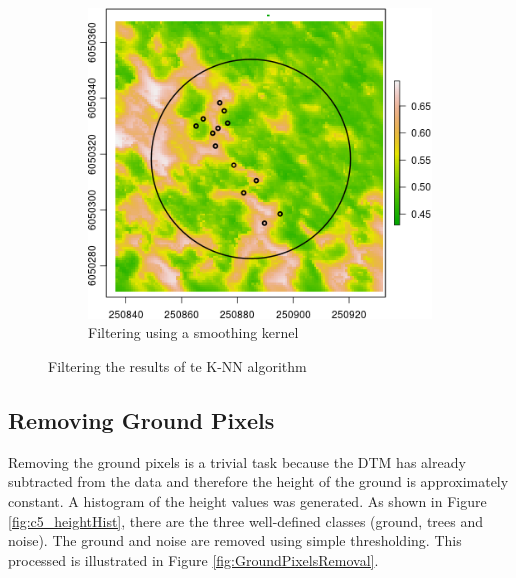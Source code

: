 \documentclass{subfiles}
\begin{document}
\begin{figure} [h!]
\begin{subfigure}[t]{.49\textwidth}
	   \includegraphics[width=\textwidth]{img/dead/c3_knn_smoothed}
	   \caption{Filtering using a smoothing kernel} 
	   \label{fig:c3_Smoothed}
	   \end{subfigure}
	   \caption{Filtering the results of te K-NN algorithm}  
	   \label{fig:salt_smooth} 
	\end{figure}

 
 \subsection{Removing Ground Pixels}\label{sec:groundMask}
 \par Removing the ground pixels is a trivial task because the DTM has already subtracted from the data and therefore the height of the ground is approximately constant. A histogram of the height values was generated. As shown in Figure \ref{fig:c5_heightHist}, there are the three well-defined classes (ground, trees and noise). The ground and noise are removed using simple thresholding. This processed is illustrated in Figure \ref{fig:GroundPixelsRemoval}.
\end{document}
